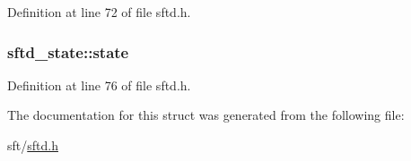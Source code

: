 Definition at line 72 of file sftd.h.

\hypertarget{structsftd__state_aa9fadd1aca3bdd4ab6b2ffacf1bfc4a8}{
\subsubsection[{state}]{ {\bf sftd\_\-state::state}}}
\label{structsftd__state_aa9fadd1aca3bdd4ab6b2ffacf1bfc4a8}


Definition at line 76 of file sftd.h.



The documentation for this struct was generated from the following file:\begin{DoxyCompactItemize}
\item 
sft/\hyperlink{sftd_8h}{sftd.h}\end{DoxyCompactItemize}
